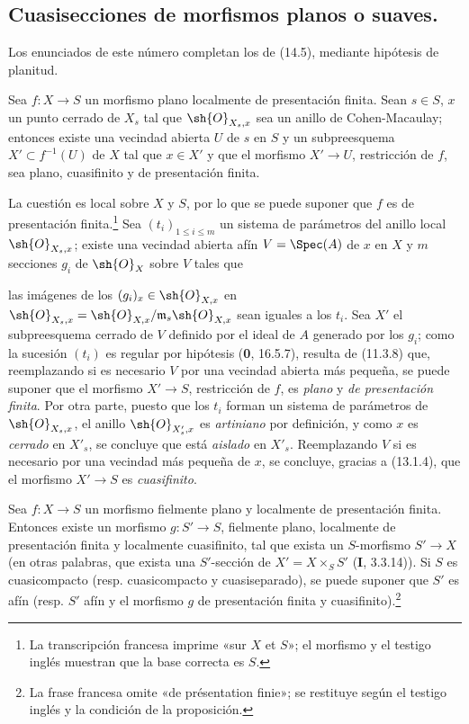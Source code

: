 \subsection{Cuasisecciones de morfismos planos o suaves.}
\label{subsection:IV.17.16}

Los enunciados de este número completan los de (14.5), mediante hipótesis de planitud.

\begin{proposition}[17.16.1]
\label{IV.17.16.1}
Sea $f:X\to S$ un morfismo plano localmente de presentación finita. Sean $s\in S$, $x$ un punto cerrado de $X_s$ tal que $\sh{O}_{X_s,x}$ sea un anillo de Cohen-Macaulay; entonces existe una vecindad abierta $U$ de $s$ en $S$ y un subpreesquema $X'\subset f^{-1}(U)$ de $X$ tal que $x\in X'$ y que el morfismo $X'\to U$, restricción de $f$, sea plano, cuasifinito y de presentación finita.
\end{proposition}

La cuestión es local sobre $X$ y $S$, por lo que se puede suponer que $f$ es de presentación finita.\footnote{La transcripción francesa imprime «sur $X$ et $S$»; el morfismo y el testigo inglés muestran que la base correcta es $S$.} Sea $(t_i)_{1\leq i\leq m}$ un sistema de parámetros del anillo local $\sh{O}_{X_s,x}$; existe una vecindad abierta afín $V=\Spec(A)$ de $x$ en $X$ y $m$ secciones $g_i$ de $\sh{O}_X$ sobre $V$ tales que


las imágenes de los $(g_i)_x\in\sh{O}_{X,x}$ en $\sh{O}_{X_s,x}=\sh{O}_{X,x}/\mathfrak m_s\sh{O}_{X,x}$ sean iguales a los $t_i$. Sea $X'$ el subpreesquema cerrado de $V$ definido por el ideal de $A$ generado por los $g_i$; como la sucesión $(t_i)$ es regular por hipótesis (\textbf 0, 16.5.7), resulta de (11.3.8) que, reemplazando si es necesario $V$ por una vecindad abierta más pequeña, se puede suponer que el morfismo $X'\to S$, restricción de $f$, es \emph{plano} y \emph{de presentación finita}. Por otra parte, puesto que los $t_i$ forman un sistema de parámetros de $\sh{O}_{X_s,x}$, el anillo $\sh{O}_{X'_s,x}$ es \emph{artiniano} por definición, y como $x$ es \emph{cerrado} en $X'_s$, se concluye que está \emph{aislado} en $X'_s$. Reemplazando $V$ si es necesario por una vecindad más pequeña de $x$, se concluye, gracias a (13.1.4), que el morfismo $X'\to S$ es \emph{cuasifinito}.

\begin{corollary}[17.16.2]
\label{IV.17.16.2}
Sea $f:X\to S$ un morfismo fielmente plano y localmente de presentación finita. Entonces existe un morfismo $g:S'\to S$, fielmente plano, localmente de presentación finita y \textup{localmente cuasifinito}, tal que exista un $S$-morfismo $S'\to X$ \textup{(en otras palabras, que exista una} $S'$-sección \textup{de} $X'=X\times_S S'$ \textup{(\textbf I, 3.3.14))}. Si $S$ es cuasicompacto \textup{(resp.} cuasicompacto y cuasiseparado\textup{)}, se puede suponer que $S'$ es afín \textup{(resp.} $S'$ afín y el morfismo $g$ de presentación finita y cuasifinito\textup{)}.\footnote{La frase francesa omite «de présentation finie»; se restituye según el testigo inglés y la condición de la proposición.}
\end{corollary}

